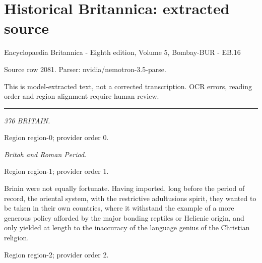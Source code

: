 \documentclass[11pt]{article}
\begin{document}
\section*{Historical Britannica: extracted source}
Encyclopaedia Britannica - Eighth edition, Volume 5, Bombay-BUR - EB.16\par
{\small Source row 2081. Parser: nvidia/nemotron-3.5-parse.\par}
{\small This is model-extracted text, not a corrected transcription. OCR errors, reading order and region alignment require human review.\par}
\hrule\medskip
{\small\itshape 376 BRITAIN.\par}

{\scriptsize\color{gray} Region region-0; provider order 0.\par}
\medskip

{\small\itshape Britah and Roman Period.\par}

{\scriptsize\color{gray} Region region-1; provider order 1.\par}
\medskip

Brinin were not equally fortunate. Having imported, long before the period of record, the oriental system, with the restrictive adultusions spirit, they wanted to be taken in their own countries, where it withstand the example of a more generous policy afforded by the major bonding reptiles or Helienic origin, and only yielded at length to the inaccuracy of the language genius of the Christian religion.
\par

{\scriptsize\color{gray} Region region-2; provider order 2.\par}
\medskip
\end{document}

